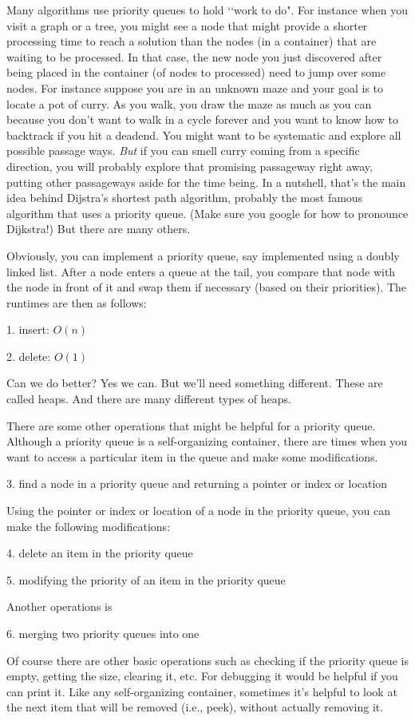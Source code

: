 Many algorithms use priority queues to hold 
\lq\lq work to do".
For instance when you visit a graph or a tree,
you might see a node that might provide
a shorter processing time to reach a solution
than the nodes (in a container) 
that are waiting to be processed.
In that case, the new node you just discovered
after being placed in the container (of nodes to 
processed)
need to jump over some nodes.
For instance suppose you are in an unknown maze
and your goal is to locate a pot of
curry. As you walk, you draw the maze as much as
you can because you don't want to walk in a
cycle forever and you want to know how to
backtrack if you hit a deadend.
You might want to be systematic and explore all
possible passage ways.
\textit{But}
if you can smell curry coming from a specific
direction, you will probably explore
that promising passageway right away, putting
other passageways aside for the time being.
In a nutshell, that's the main idea 
behind Dijstra's shortest path algorithm, 
probably the most famous algorithm that uses
a priority queue.
(Make sure you google for how to pronounce
Dijkstra!)
But there are many others.

Obviously, you can implement a priority
queue, say implemented using a doubly linked list.
After a node enters a queue at the tail, you 
compare that node with the node in front of it
and swap them if necessary (based on their
priorities).
The runtimes are then as follows:
\begin{tightlist}
  \item[1.] insert: $O(n)$
  \item[2.] delete: $O(1)$
\end{tightlist}
Can we do better?
Yes we can. But we'll need something different.
These are called heaps.
And there are many different types of heaps.

There are some other operations that might be helpful
for a priority queue.
Although a priority queue is a self-organizing container,
there are times when you want to access a particular
item in the queue and make some modifications. 
\begin{tightlist}
  \item[3.] find a node in a priority queue and returning a pointer or index or location
\end{tightlist}
Using the pointer or index or location of a node in the priority queue, you can make the
following modifications:
\begin{tightlist}
  \item[4.] delete an item in the priority queue 
  \item[5.] modifying the priority of an item in the priority queue 
\end{tightlist}
Another operations is 
\begin{tightlist}
  \item[6.] merging two priority queues into one
\end{tightlist}
Of course there are other basic operations such as 
checking if the priority queue is empty, getting the size,
clearing it, etc.
For debugging it would be helpful if you can print it.
Like any self-organizing container, 
sometimes it's helpful to look at the next item that
will be removed (i.e., peek), without actually removing it.


